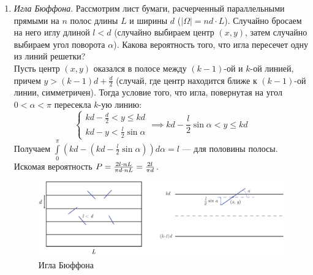 \begin{enumerate}
            \item \emph{Игла Бюффона}. Рассмотрим лист бумаги, расчерченный параллельными прямыми на $n$ полос длины $L$ и ширины $d$ ($|\Omega| = nd \cdot L$). Случайно бросаем на него иглу длиной $l < d$ (случайно выбираем центр $(x, y)$, затем случайно выбираем угол поворота $\alpha$). Какова вероятность того, что игла пересечет одну из линий решетки?\\
            Пусть центр $(x, y)$ оказался в полосе между $(k - 1)$-ой и $k$-ой линией, причем $y > (k - 1)d + \frac{d}{2}$ (случай, где центр находится ближе к $(k - 1)$-ой линии, симметричен). Тогда условие того, что игла, повернутая на угол $0 < \alpha < \pi$ пересекла $k$-ую линию:
            \begin{equation*}
                \begin{cases}
                    kd - \frac{d}{2} < y \leq kd\\
                    kd - y < \frac{l}{2}\sin\alpha
                \end{cases} \implies kd - \frac{l}{2}\sin\alpha < y \leq kd
            \end{equation*}
            Получаем $\int\limits_0^{\pi} (kd - (kd - \frac{l}{2}\sin\alpha))d\alpha = l$ --- для половины полосы.\\
            Искомая вероятность $\P = \frac{2l \cdot nL}{\pi d \cdot nL} = \frac{2l}{\pi d}$.
            \begin{figure}[h!]
				\centering
				\includegraphics[width=0.9\linewidth]{Lect02/buffon.pdf}
				\caption{Игла Бюффона}
				\label{lect02:pic3}
			\end{figure}
        \end{enumerate}
